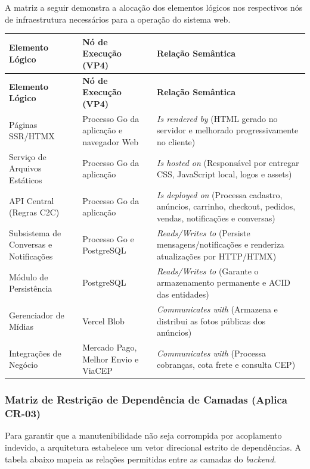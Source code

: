 \documentclass[12pt, a4paper]{article}
\begin{document}
A matriz a seguir demonstra a alocação dos elementos lógicos nos respectivos nós de infraestrutura necessários para a operação do sistema web.

\begin{longtable}{|p{4cm}|p{5cm}|p{5cm}|}
\hline
\textbf{Elemento Lógico} & \textbf{Nó de Execução (VP4)} & \textbf{Relação Semântica} \\
\hline
\endfirsthead
\hline
\textbf{Elemento Lógico} & \textbf{Nó de Execução (VP4)} & \textbf{Relação Semântica} \\
\hline
\endhead
Páginas SSR/HTMX & Processo Go da aplicação e navegador Web & \textit{Is rendered by} (HTML gerado no servidor e melhorado progressivamente no cliente) \\
\hline
Serviço de Arquivos Estáticos & Processo Go da aplicação & \textit{Is hosted on} (Responsável por entregar CSS, JavaScript local, logos e assets) \\
\hline
API Central (Regras C2C) & Processo Go da aplicação & \textit{Is deployed on} (Processa cadastro, anúncios, carrinho, checkout, pedidos, vendas, notificações e conversas) \\
\hline
Subsistema de Conversas e Notificações & Processo Go e PostgreSQL & \textit{Reads/Writes to} (Persiste mensagens/notificações e renderiza atualizações por HTTP/HTMX) \\
\hline
Módulo de Persistência & PostgreSQL & \textit{Reads/Writes to} (Garante o armazenamento permanente e ACID das entidades) \\
\hline
Gerenciador de Mídias & Vercel Blob & \textit{Communicates with} (Armazena e distribui as fotos públicas dos anúncios) \\
\hline
Integrações de Negócio & Mercado Pago, Melhor Envio e ViaCEP & \textit{Communicates with} (Processa cobranças, cota frete e consulta CEP) \\
\hline
\end{longtable}

\subsubsection{Matriz de Restrição de Dependência de Camadas (Aplica CR-03)}

Para garantir que a manutenibilidade não seja corrompida por acoplamento indevido, a arquitetura estabelece um vetor direcional estrito de dependências. A tabela abaixo mapeia as relações permitidas entre as camadas do \textit{backend}.
\end{document}
